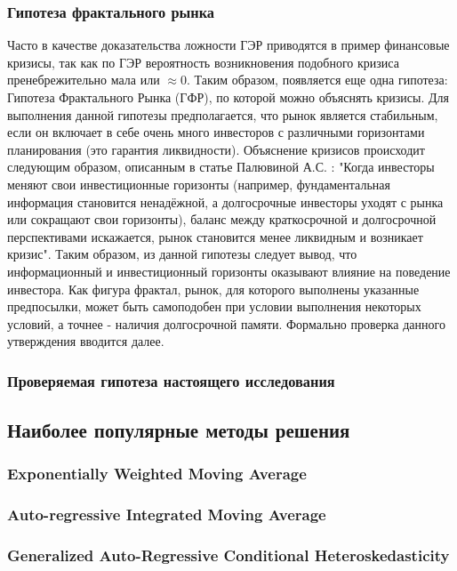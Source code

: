 		\subsubsection{Гипотеза фрактального рынка}
			Часто в качестве доказательства ложности ГЭР приводятся в пример финансовые кризисы, так как по ГЭР вероятность возникновения подобного кризиса пренебрежительно мала или $\approx 0$. Таким образом, появляется еще одна гипотеза: Гипотеза Фрактального Рынка (ГФР), по которой можно объяснять кризисы. Для выполнения данной гипотезы предполагается, что рынок является стабильным, если он включает в себе очень много инвесторов с различными горизонтами планирования (это гарантия ликвидности). Объяснение кризисов происходит следующим образом, описанным в статье Палювиной А.С. \cite{fractal_market}: "Когда инвесторы меняют свои инвестиционные горизонты (например, фундаментальная информация становится ненадёжной, а	долгосрочные инвесторы уходят с рынка или сокращают свои горизонты),	баланс между краткосрочной и долгосрочной перспективами искажается,	рынок становится менее ликвидным и возникает кризис". Таким образом, из данной гипотезы следует вывод, что информационный и инвестиционный горизонты оказывают влияние на поведение инвестора. Как фигура фрактал, рынок, для которого выполнены указанные предпосылки, может быть самоподобен при условии выполнения некоторых условий, а точнее - наличия долгосрочной памяти. Формально проверка данного утверждения вводится далее.
		\subsubsection[Проверяемая гипотеза]{Проверяемая гипотеза настоящего исследования}
	\subsection{Наиболее популярные методы решения}
		\subsubsection{Exponentially Weighted Moving Average}
		\subsubsection{Auto-regressive Integrated Moving Average}
		\subsubsection{Generalized Auto-Regressive Conditional Heteroskedasticity}
